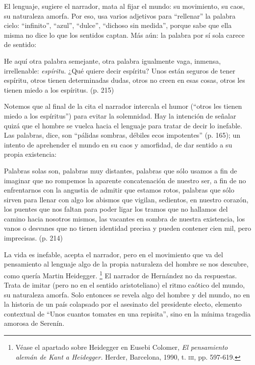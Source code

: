 \documentclass[14pt,twoside,final]{extbook} %
\let\oldfootnote\footnote
\renewcommand\footnote[1]{%
\oldfootnote{\hspace{1mm}#1}}
\begin{document}
El lenguaje, sugiere el narrador, mata al fijar el mundo: su movimiento, su caos, su naturaleza amorfa. Por eso, usa varios adjetivos para ``rellenar'' la palabra cielo: ``infinito'', ``azul'', ``dulce'', ``dichoso sin medida'', porque sabe que ella misma no dice lo que los sentidos captan. Más aún: la palabra por sí sola carece de sentido:
\begin{quoting}
He aquí otra palabra semejante, otra palabra igualmente vaga, inmensa, irrellenable: \emph{espíritu.} ¿Qué quiere decir espíritu? Unos están seguros de tener espíritu, otros tienen determinadas dudas, otros no creen en esas cosas, otros les tienen miedo a los espíritus. (p. 215)
\end{quoting}
Notemos que al final de la cita el narrador intercala el humor (``otros les tienen miedo a los espíritus'') para evitar la solemnidad. Hay la intención de señalar quizá que el hombre se vuelca hacia el lenguaje para tratar de decir lo inefable. Las palabras, dice, son ``pálidas sombras, débiles ecos impotentes'' (p. 165); un intento de aprehender el mundo en su caos y amorfidad, de dar sentido a su propia existencia:
\begin{quoting}
Palabras solas son, palabras muy distantes, palabras que sólo usamos a fin de imaginar que no rompemos la aparente concatenación de nuestro ser, a fin de no enfrentarnos con la angustia de admitir que estamos rotos, palabras que sólo sirven para llenar con algo los abismos que vigilan, sedientos, en nuestro corazón, los puentes que nos faltan para poder ligar los tramos que no hallamos del camino hacia nosotros mismos, las vacantes en sombra de nuestra existencia, los vanos o desvanes que no tienen identidad precisa y pueden contener cien mil, pero imprecisas. (p. 214)
\end{quoting}
La vida es inefable, acepta el narrador, pero en el movimiento que va del pensamiento al lenguaje algo de la propia naturaleza del hombre se nos descubre, como quería Martin Heidegger.\footnote{Véase el apartado sobre Heidegger en Eusebi Colomer, \emph{El pensamiento alemán de Kant a Heidegger.} Herder, Barcelona, 1990, t. \textsc{iii}, pp. 597-619.} El narrador de Hernández no da respuestas. Trata de imitar (pero no en el sentido aristoteliano) el ritmo caótico del mundo, su naturaleza amorfa. Solo entonces se revela algo del hombre y del mundo, no en la historia de un país colapsado por el asesinato del presidente electo, elemento contextual de ``Unos cuantos tomates en una repisita'', sino en la mínima tragedia amorosa de Serenín.
\end{document}
